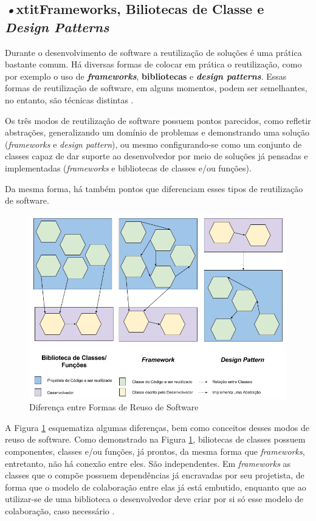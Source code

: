 \subsection{\textit{•}xtit{Frameworks}, Biliotecas de Classe e \textit{Design Patterns}}
Durante o desenvolvimento de software a reutilização de soluções é uma prática bastante comum. Há diversas formas de colocar em prática o reutilização, como por exemplo o uso de \textbf{\textit{frameworks}}, \textbf{bibliotecas} e \textbf{\textit{design patterns}}. Essas formas de reutilização de software, em alguns momentos, podem ser semelhantes, no entanto, são técnicas distintas \cite{barretoJunior2006}.
\par
\indent Os três modos de reutilização de software possuem pontos parecidos, como refletir abstrações, generalizando um domínio de problemas e demonstrando uma solução (\textit{frameworks} e \textit{design pattern}), ou mesmo configurando-se como um conjunto de classes capaz de dar suporte ao desenvolvedor por meio de soluções já pensadas e implementadas (\textit{frameworks} e bibliotecas de classes e/ou funções).
\par
\indent Da mesma forma, há também pontos que diferenciam esses tipos de reutilização de software.
  \begin{figure}[h]
    \centering
    \includegraphics[width=\textwidth]{figuras/bibFrameworkDesignPattern.png}
    \caption{Diferença entre Formas de Reuso de Software}
    \label{fig:bibFrameworkPattern}
  \end{figure}
\par
\indent A Figura \ref{fig:bibFrameworkPattern} esquematiza algumas diferenças, bem como conceitos desses modos de reuso de software. Como demonstrado na Figura \ref{fig:bibFrameworkPattern}, biliotecas de classes possuem componentes, classes e/ou funções, já prontos, da mesma forma que \textit{frameworks}, entretanto, não há conexão entre eles. São independentes. Em \textit{frameworks} as classes que o compõe possuem dependências já encravadas por seu projetista, de forma que o modelo de colaboração entre elas já está embutido, enquanto que ao utilizar-se de uma biblioteca o desenvolvedor deve criar por si só esse modelo de colaboração, caso necessário \cite{barretoJunior2006}.
